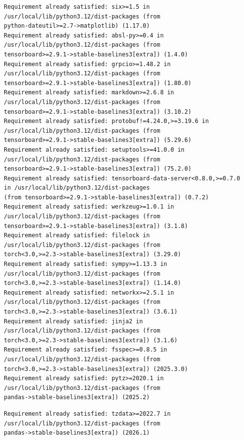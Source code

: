 \documentclass[11pt]{article}
\begin{document}
    
    
    \begin{Verbatim}[commandchars=\\\{\}]
Requirement already satisfied: six>=1.5 in /usr/local/lib/python3.12/dist-packages (from 
python-dateutil>=2.7->matplotlib) (1.17.0)
Requirement already satisfied: absl-py>=0.4 in /usr/local/lib/python3.12/dist-packages (from 
tensorboard>=2.9.1->stable-baselines3[extra]) (1.4.0)
Requirement already satisfied: grpcio>=1.48.2 in /usr/local/lib/python3.12/dist-packages (from 
tensorboard>=2.9.1->stable-baselines3[extra]) (1.80.0)
Requirement already satisfied: markdown>=2.6.8 in /usr/local/lib/python3.12/dist-packages (from 
tensorboard>=2.9.1->stable-baselines3[extra]) (3.10.2)
Requirement already satisfied: protobuf!=4.24.0,>=3.19.6 in /usr/local/lib/python3.12/dist-packages (from 
tensorboard>=2.9.1->stable-baselines3[extra]) (5.29.6)
Requirement already satisfied: setuptools>=41.0.0 in /usr/local/lib/python3.12/dist-packages (from 
tensorboard>=2.9.1->stable-baselines3[extra]) (75.2.0)
Requirement already satisfied: tensorboard-data-server<0.8.0,>=0.7.0 in /usr/local/lib/python3.12/dist-packages 
(from tensorboard>=2.9.1->stable-baselines3[extra]) (0.7.2)
Requirement already satisfied: werkzeug>=1.0.1 in /usr/local/lib/python3.12/dist-packages (from 
tensorboard>=2.9.1->stable-baselines3[extra]) (3.1.8)
Requirement already satisfied: filelock in /usr/local/lib/python3.12/dist-packages (from 
torch<3.0,>=2.3->stable-baselines3[extra]) (3.29.0)
Requirement already satisfied: sympy>=1.13.3 in /usr/local/lib/python3.12/dist-packages (from 
torch<3.0,>=2.3->stable-baselines3[extra]) (1.14.0)
Requirement already satisfied: networkx>=2.5.1 in /usr/local/lib/python3.12/dist-packages (from 
torch<3.0,>=2.3->stable-baselines3[extra]) (3.6.1)
Requirement already satisfied: jinja2 in /usr/local/lib/python3.12/dist-packages (from 
torch<3.0,>=2.3->stable-baselines3[extra]) (3.1.6)
Requirement already satisfied: fsspec>=0.8.5 in /usr/local/lib/python3.12/dist-packages (from 
torch<3.0,>=2.3->stable-baselines3[extra]) (2025.3.0)
Requirement already satisfied: pytz>=2020.1 in /usr/local/lib/python3.12/dist-packages (from 
pandas->stable-baselines3[extra]) (2025.2)

    \end{Verbatim}

    
    
    \begin{Verbatim}[commandchars=\\\{\}]
Requirement already satisfied: tzdata>=2022.7 in /usr/local/lib/python3.12/dist-packages (from 
pandas->stable-baselines3[extra]) (2026.1)

    \end{Verbatim}
\end{document}
